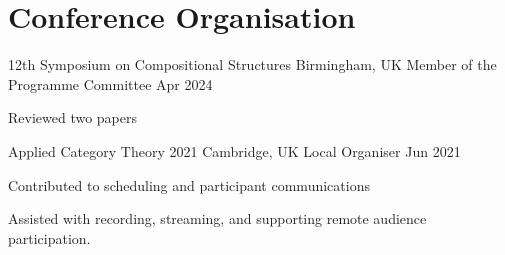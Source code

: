 \documentclass{academic-cv}
\begin{document}
\section*{Conference Organisation}
    \begin{cvlist}
        \cvheading
            {12th Symposium on Compositional Structures}
            {Birmingham, UK}
            {Member of the Programme Committee}
            {Apr 2024}
            {\begin{cvlist}
                \item Reviewed two papers
            \end{cvlist}}
        \cvheading
            {Applied Category Theory 2021}
            {Cambridge, UK}
            {Local Organiser}
            {Jun 2021}
            {\begin{cvlist}
                \item Contributed to scheduling and participant communications
                \item Assisted with recording, streaming, and supporting remote audience participation.
            \end{cvlist}}
    \end{cvlist}
\end{document}
